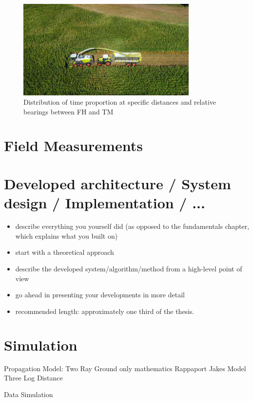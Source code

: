 \documentclass[]{nsm-thesis}
\begin{document}
\begin{figure}%
	\centering
	\includegraphics[width=0.8\textwidth]{figures/claas_harvest_behind.png}
	\caption{Distribution of time proportion at specific distances and relative bearings between \ac{FH} and \ac{TM}}%
	\label{fig:startpart}%
\end{figure}

\chapter{Field Measurements}


\chapter{Developed architecture / System design / Implementation / ...}


\begin{itemize}
\item describe everything you yourself did (as opposed to the fundamentals chapter, which explains what you built on)
\item start with a theoretical approach
\item describe the developed system/algorithm/method from a high-level point of view
\item go ahead in presenting your developments in more detail
\item recommended length: approximately one third of the thesis.
\end{itemize}

\chapter{Simulation}

Propagation Model:
 Two Ray Ground only mathematics Rappaport
 Jakes Model
 Three Log Distance
 
 
 Data Simulation
 
\end{document}
